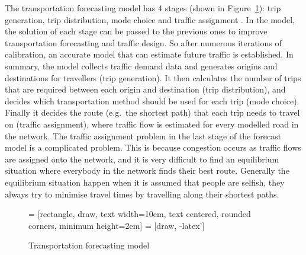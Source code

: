 The transportation forecasting model has 4 stages (shown in Figure~\ref{fig:model}):
trip generation, trip distribution, mode choice and traffic assignment \citep{Sheffi}.
In the model, the solution of each stage can be passed to the previous ones to improve transportation forecasting and traffic design.
So after numerous iterations of calibration,
an accurate model that can estimate future traffic is established.
In summary, 
the model collects traffic demand data and 
generates origins and destinations for travellers (trip generation).
It then calculates the number of trips that are required between each origin and destination (trip distribution),
and decides which transportation method should be used for each trip (mode choice).
Finally it decides the route (e.g.\ the shortest path) that each trip needs to travel on (traffic assignment), 
where traffic flow is estimated for every modelled road in the network.
The traffic assignment problem in the last stage of the forecast model is a complicated problem.
This is because congestion occurs as traffic flows are assigned onto the network,
and it is very difficult to find an equilibrium situation where everybody in the network finds their best route.
Generally the equilibrium situation happen when it is assumed that people are selfish,
they always try to minimise travel times by travelling along their shortest paths.

\begin{figure}[H]
    \centering
     = [rectangle, draw, text width=10em, text centered, rounded corners, minimum height=2em]
     = [draw, -latex']
    \caption{Transportation forecasting model}
    \label{fig:model}
\end{figure}



